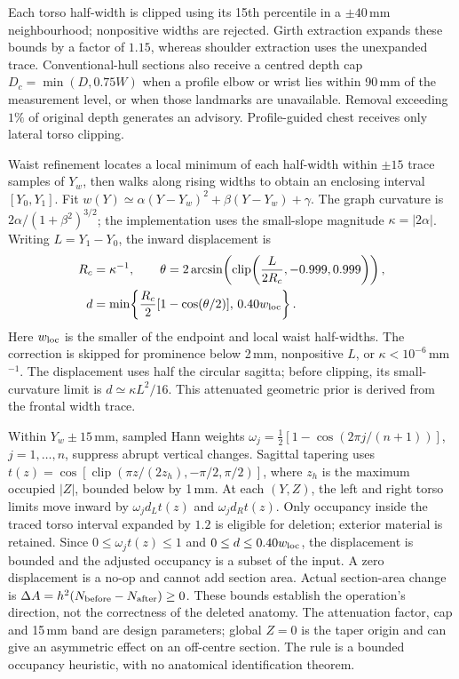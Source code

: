 \documentclass[11pt,a4paper]{article}
\newcommand{\clip}{\operatorname{clip}}
\begin{document}
Each torso half-width is clipped using its 15th percentile in a $\pm40$\,mm neighbourhood; nonpositive widths are rejected. Girth extraction expands these bounds by a factor of $1.15$, whereas shoulder extraction uses the unexpanded trace. Conventional-hull sections also receive a centred depth cap $D_c=\min(D,0.75W)$ when a profile elbow or wrist lies within 90\,mm of the measurement level, or when those landmarks are unavailable. Removal exceeding $1\%$ of original depth generates an advisory. Profile-guided chest receives only lateral torso clipping.

Waist refinement locates a local minimum of each half-width within $\pm15$ trace samples of $Y_w$, then walks along rising widths to obtain an enclosing interval $[Y_0,Y_1]$. Fit $w(Y)\simeq\alpha(Y-Y_w)^2+\beta(Y-Y_w)+\gamma$. The graph curvature is $2\alpha/(1+\beta^2)^{3/2}$; the implementation uses the small-slope magnitude $\kappa=|2\alpha|$. Writing $L=Y_1-Y_0$, the inward displacement is
\begin{equation}
 \begin{aligned}
 R_c&=\kappa^{-1},\qquad
 \theta=2\arcsin\!\left(\clip\!\left(\frac{L}{2R_c},-0.999,0.999\right)\right),\\
 d&=\min\!\left\{\frac{R_c}{2}[1-\cos(\theta/2)],\,0.40w_{\rm loc}\right\}.
 \end{aligned}
 \label{eq:waist}
\end{equation}
Here $w_{\rm loc}$ is the smaller of the endpoint and local waist half-widths. The correction is skipped for prominence below 2\,mm, nonpositive $L$, or $\kappa<10^{-6}$\,mm$^{-1}$. The displacement uses half the circular sagitta; before clipping, its small-curvature limit is $d\simeq\kappa L^2/16$. This attenuated geometric prior is derived from the frontal width trace.

Within $Y_w\pm15$\,mm, sampled Hann weights $\omega_j=\tfrac12[1-\cos(2\pi j/(n+1))]$, $j=1,\ldots,n$, suppress abrupt vertical changes. Sagittal tapering uses $t(z)=\cos[\clip(\pi z/(2z_h),-\pi/2,\pi/2)]$, where $z_h$ is the maximum occupied $|Z|$, bounded below by 1\,mm. At each $(Y,Z)$, the left and right torso limits move inward by $\omega_jd_Lt(z)$ and $\omega_jd_Rt(z)$. Only occupancy inside the traced torso interval expanded by $1.2$ is eligible for deletion; exterior material is retained. Since $0\leq\omega_jt(z)\leq1$ and $0\leq d\leq0.40w_{\rm loc}$, the displacement is bounded and the adjusted occupancy is a subset of the input. A zero displacement is a no-op and cannot add section area. Actual section-area change is $\Delta A=h^2(N_{\rm before}-N_{\rm after})\geq0$. These bounds establish the operation's direction, not the correctness of the deleted anatomy. The attenuation factor, cap and 15\,mm band are design parameters; global $Z=0$ is the taper origin and can give an asymmetric effect on an off-centre section. The rule is a bounded occupancy heuristic, with no anatomical identification theorem.
\end{document}
